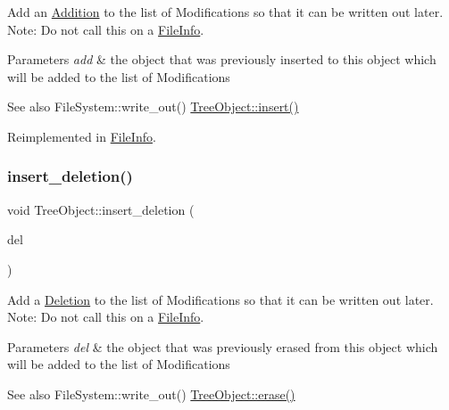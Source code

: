 Add an \mbox{\hyperlink{classAddition}{Addition}} to the list of Modifications so that it can be written out later. Note\+: Do not call this on a \mbox{\hyperlink{classFileInfo}{File\+Info}}. 
\begin{DoxyParams}{Parameters}
{\em add} & the object that was previously inserted to this object which will be added to the list of Modifications \\
\hline
\end{DoxyParams}
\begin{DoxySeeAlso}{See also}
File\+System\+::write\+\_\+out() \mbox{\hyperlink{classTreeObject_af8cc57edba9f435b52ccf33cfbbb2fc6}{Tree\+Object\+::insert()}} 
\end{DoxySeeAlso}


Reimplemented in \mbox{\hyperlink{classFileInfo_a7f788f31521c535646eebfa9959bbb24}{File\+Info}}.

\mbox{\label{classTreeObject_afcc4b3928d2b77ff080aa229a9706215}} 
\subsubsection{\texorpdfstring{insert\+\_\+deletion()}{insert\_deletion()}}
{\footnotesize\ttfamily void Tree\+Object\+::insert\+\_\+deletion (\begin{DoxyParamCaption}\item[{\mbox{\hyperlink{classTreeObject}{Tree\+Object}} $\ast$}]{del }\end{DoxyParamCaption})\hspace{0.3cm}{\ttfamily [virtual]}}

Add a \mbox{\hyperlink{classDeletion}{Deletion}} to the list of Modifications so that it can be written out later. Note\+: Do not call this on a \mbox{\hyperlink{classFileInfo}{File\+Info}}. 
\begin{DoxyParams}{Parameters}
{\em del} & the object that was previously erased from this object which will be added to the list of Modifications \\
\hline
\end{DoxyParams}
\begin{DoxySeeAlso}{See also}
File\+System\+::write\+\_\+out() \mbox{\hyperlink{classTreeObject_a453b5df2a9ef7c6faad259900d574ee2}{Tree\+Object\+::erase()}} 
\end{DoxySeeAlso}



